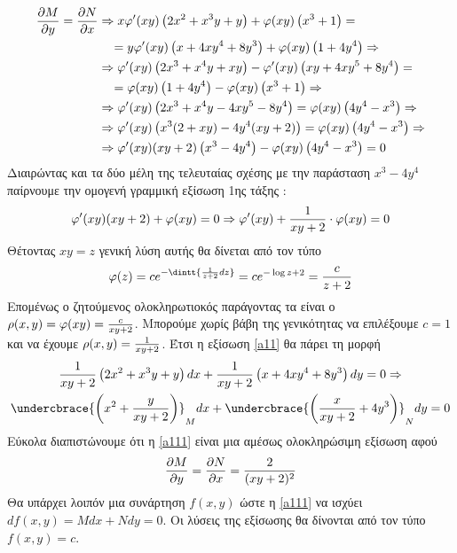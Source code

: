 \documentclass[a4paper,twoside,11pt]{book}
\DeclareRobustCommand{\frac}[3][0pt]{%
{\begingroup\hspace{#1}#2\hspace{#1}\endgroup\over\hspace{#1}#3\hspace{#1}}}
\begin{document}
\begin{align*}
\frac{\partial M}{\partial y}=\frac{\partial N}{\partial x}
&\Rightarrow x\varphi'(xy)\left(2x^2+x^3y+y\right)+\varphi(xy)\left(x^3+1\right)=\\
&\phantom{\Rightarrow}=y\varphi'(xy)\left(x+4xy^4+8y^3 \right)+\varphi(xy)\left(1+4y^4\right)\Rightarrow\\
&\Rightarrow \varphi'(xy)\left(2x^3+x^4y+xy\right)-\varphi'(xy)\left(xy+4xy^5+8y^4\right)=\\
&\phantom{\Rightarrow}=\varphi(xy)\left(1+4y^4\right)-\varphi(xy)\left(x^3+1\right)\Rightarrow\\
&\Rightarrow \varphi'(xy)\left(2x^3+x^4y-4xy^5-8y^4\right)=\varphi(xy)\left(4y^4-x^3\right)\Rightarrow\\
&\Rightarrow\varphi'(xy)\left(x^3(2+xy)-4y^4(xy+2)\right)=\varphi(xy)\left(4y^4-x^3\right)\Rightarrow\\
& \Rightarrow\varphi'(xy)(xy+2)\left(x^3-4y^4\right)-\varphi(xy)\left(4y^4-x^3\right)=0
\end{align*}
Διαιρώντας και τα δύο μέλη της τελευταίας σχέσης με την παράσταση $ x^3-4y^4 $ παίρνουμε την ομογενή γραμμική εξίσωση 1ης τάξης :
\begin{equation}
\varphi'(xy)(xy+2)+\varphi(xy)=0\Rightarrow \varphi'(xy)+\frac{1}{xy+2}\cdot\varphi(xy)=0
\end{equation}
Θέτοντας $ xy=z $ γενική λύση αυτής θα δίνεται από τον τύπο
\begin{gather*}
\varphi(z)=ce^{-\dintt{\frac{1}{z+2}dz}}=ce^{-\log{z+2}}=\frac{c}{z+2}
\end{gather*}
Επομένως ο ζητούμενος ολοκληρωτιοκός παράγοντας τα είναι ο $ \rho(x,y)=\varphi(xy)=\frac{c}{xy+2} $. Μπορούμε χωρίς βάβη της γενικότητας να επιλέξουμε $ c=1 $ και να έχουμε $ \rho(x,y)=\frac{1}{xy+2} $. Έτσι η εξίσωση \eqref{a11} θα πάρει τη μορφή 
\begin{gather}
\frac{1}{xy+2}\left(2x^2+x^3y+y\right)dx+\frac{1}{xy+2}\left(x+4xy^4+8y^3\right)dy=0\Rightarrow\nonumber\\ \undercbrace{\left(x^2+\frac{y}{xy+2}\right)}_{M}dx+\undercbrace{\left(\frac{x}{xy+2}+4y^3\right)}_{N}dy=0\label{a111}
\end{gather}
Εύκολα διαπιστώνουμε ότι η \eqref{a111} είναι μια αμέσως ολοκληρώσιμη εξίσωση αφού
\[ \dfrac{\partial M}{\partial y}=\dfrac{\partial N}{\partial x}=\frac{2}{(xy+2)^2} \]
Θα υπάρχει λοιπόν μια συνάρτηση $ f(x,y) $ ώστε η \eqref{a111} να ισχύει $ df(x,y)=Mdx+Ndy=0 $. Οι λύσεις της εξίσωσης θα δίνονται από τον τύπο $ f(x,y)=c $.
\end{document}
